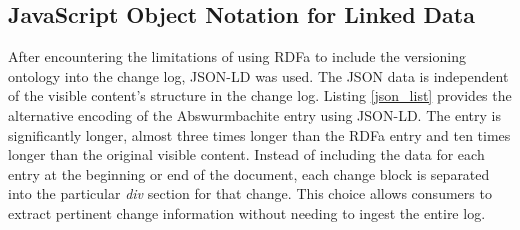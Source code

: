 \subsection{JavaScript Object Notation for Linked Data}
After encountering the limitations of using RDFa to include the versioning ontology into the change log, JSON-LD was used.
The JSON data is independent of the visible content's structure in the change log.
Listing \ref{json_list} provides the alternative encoding of the Abswurmbachite entry using JSON-LD.
The entry is significantly longer, almost three times longer than the RDFa entry and ten times longer than the original visible content.
Instead of including the data for each entry at the beginning or end of the document, each change block is separated into the particular \textit{div} section for that change.
This choice allows consumers to extract pertinent change information without needing to ingest the entire log.

